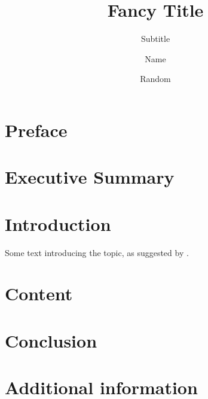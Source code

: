 \documentclass{hu}
\title{Fancy Title}
\subtitle{Subtitle}
\author{Name}{McNameFace}{0000042}
\author{Random}{Person}{0000652}
\begin{document}
\frontmatter

\maketitle

\chapter{Preface}
\chapter{Executive Summary}
\tableofcontents* %

\mainmatter

\chapter{Introduction}
Some text introducing the topic, as suggested by \cite{citation}.
\chapter{Content}
\chapter{Conclusion}

\appendix

  \printbibliography
\chapter{Additional information}
\end{document}
